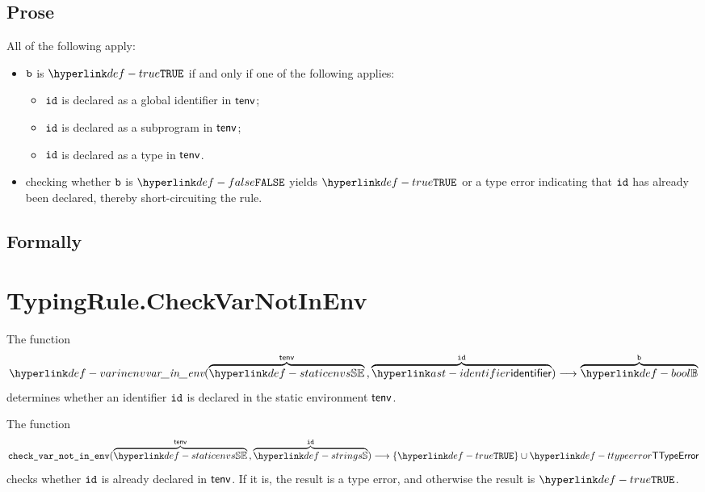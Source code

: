\subsection{Prose}
All of the following apply:
\begin{itemize}
  \item $\vb$ is $\True$ if and only if one of the following applies:
  \begin{itemize}
    \item $\id$ is declared as a global identifier in $\tenv$;
    \item $\id$ is declared as a subprogram in $\tenv$;
    \item $\id$ is declared as a type in $\tenv$.
  \end{itemize}

  \item checking whether $\vb$ is $\False$ yields $\True$ or a type error indicating
        that $\id$ has already been declared, thereby short-circuiting the rule.
\end{itemize}

\subsection{Formally}
\begin{mathpar}
\end{mathpar}

\hypertarget{def-checkvarnotinenv}{}
\hypertarget{def-varinenv}{}
\section{TypingRule.CheckVarNotInEnv}
The function
\[
  \varinenv{\overname{\staticenvs}{\tenv} \aslsep \overname{\identifier}{\id}}
  \aslto \overname{\Bool}{\vb}
\]
determines whether an identifier $\id$ is declared in the static environment $\tenv$.

The function
\[
  \checkvarnotinenv{\overname{\staticenvs}{\tenv} \aslsep \overname{\Strings}{\id}}
  \aslto \{\True\} \cup \TTypeError
\]
checks whether $\id$ is already declared in $\tenv$. If it is, the result is a type error,
and otherwise the result is $\True$.

